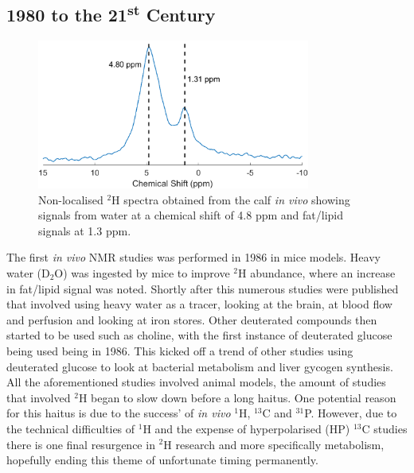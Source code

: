 \documentclass[class=article, crop=false]{standalone}
\begin{document}
\subsection{1980 to the 21\textsuperscript{st} Century}


\begin{figure}
    \centering
    \includegraphics[width=0.8\textwidth]{Figures/Intro/NA_Spectra.png}
    \caption{Non-localised $^2$H spectra obtained from the calf \textit{in vivo} showing signals from water at a chemical shift of 4.8 ppm and fat/lipid signals at 1.3 ppm.}
    \label{fig:intro:NA}
\end{figure}

The first \textit{in vivo} NMR studies was performed in 1986\cite{Brereton1986PreliminarySpectroscopy} in mice models. Heavy water (D$_2$O) was ingested by mice to improve $^2$H abundance, where an increase in fat/lipid signal was noted. Shortly after this numerous studies were published that involved using heavy water as a tracer, looking at the brain\cite{Ewy1988DeuteriumSitu}, at blood flow and perfusion\cite{Ackerman1987DeuteriumTracer.} and looking at iron stores\cite{Irving1987InSpectroscopy}. Other deuterated compounds then started to be used such as choline\cite{Eng1990RenalStudy}, with the first instance of deuterated glucose being used being in 1986\cite{Barrow1986NMRMobilis}. This kicked off a trend of other studies using deuterated glucose to look at bacterial metabolism\cite{Aguayo1988HighMetabolism.} and liver gycogen synthesis\cite{Goodman1989UseSynthesis}. All the aforementioned studies involved animal models, the amount of studies that involved $^2$H began to slow down before a long haitus. One potential reason for this haitus is due to the success' of \textit{in vivo} $^1$H\cite{Harada1984IdentificationScience}, $^{13}$C\cite{Cohen1980UseLiver} and $^{31}$P\cite{Sappey-Marinier1992EffectSpectroscopy}. However, due to the technical difficulties of $^1$H and the expense of hyperpolarised (HP) $^{13}$C studies there is one final resurgence in $^2$H research and more specifically metabolism, hopefully ending this theme of unfortunate timing permanently. 
\end{document}
